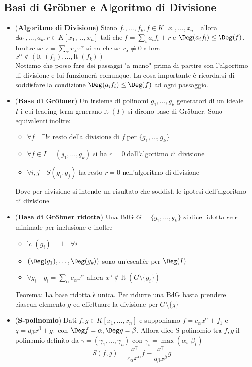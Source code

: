 \documentclass[a4paper,NoNotes,GeneralMath]{stdmdoc}
\newcommand{\Lt}{\text{lt }}
\newcommand{\Lc}{\text{lc }}
\begin{document}
	\subsection*{Basi di Gröbner e Algoritmo di Divisione}
	\begin{itemize}
		\item ({\bf Algoritmo di Divisione}) Siano $f_1, \ldots, f_k, f \in K[x_1, \ldots, x_n]$ allora $\exists a_1, \ldots, a_k, r \in K[x_1, \ldots, x_n]$ tali che $f = \sum_i a_i f_i + r$ e $\Deg (a_i f_i) \le \Deg(f)$. Inoltre se $r = \sum_\alpha r_\alpha x^\alpha$ si ha che se $r_\alpha \neq 0$ allora $x^\alpha \notin (\Lt(f_1), \ldots, \Lt(f_k))$ \\
		Notiamo che posso fare dei passaggi "a mano" prima di partire con l'algoritmo di divisione e lui funzionerà comunque. La cosa importante è ricordarsi di soddisfare la condizione $\Deg (a_i f_i) \le \Deg(f)$ ad ogni passaggio.
		\item ({\bf Base di Gröbner}) Un insieme di polinomi $g_1, \ldots, g_k$ generatori di un ideale $I$ i cui leading term generano $\Lt(I)$ si dicono base di Gröbner. Sono equivalenti inoltre:
			\begin{itemize}
				\item $\forall f \quad \exists ! r$ resto della divisione di $f$ per $\{g_1, \ldots, g_k\}$
				\item $\forall f \in I = (g_1, \ldots, g_k)$ si ha $r = 0$ dall'algoritmo di divisione
				\item $\forall i,j \quad S(g_i, g_j)$ ha resto $r = 0$ nell'algoritmo di divisione
			\end{itemize}
		Dove per divisione si intende un risultato che soddisfi le ipotesi dell'algoritmo di divisione
		\item ({\bf Base di Gröbner ridotta}) Una BdG $G = \{ g_1, \ldots, g_k \}$ si dice ridotta se è minimale per inclusione e inoltre
			\begin{itemize}
				\item $\Lc(g_i) = 1 \quad \forall i$
				\item $(\Deg(g_1), \ldots, \Deg(g_k))$ sono un'escalièr per $\Deg(I)$
				\item $\forall g_i \quad g_i = \sum_\alpha c_\alpha x^\alpha$ allora $x^\alpha \notin \Lt(G \setminus \{g_i\})$
			\end{itemize}
		Teorema: La base ridotta è unica. Per ridurre una BdG basta prendere ciascun elemento $g$ ed effettuare la divisione per $G \setminus \{g\}$
		\item ({\bf S-polinomio}) Dati $f, g \in K[x_1, \ldots, x_n]$ e supponiamo $f = c_\alpha x^\alpha + f_1$ e $g = d_\beta x^\beta + g_1$ con $\Deg f = \alpha, \Deg g = \beta$. Allora dico S-polinomio tra $f, g$ il polinomio definito da $\gamma = (\gamma_1, \ldots, \gamma_n)$ con $\gamma_i = \max(\alpha_i, \beta_i)$
			$$ S(f, g) = \frac{x^\gamma}{c_\alpha x^\alpha} f - \frac{x^\gamma}{d_\beta x^\beta} g $$
	\end{itemize}
	
\end{document}
